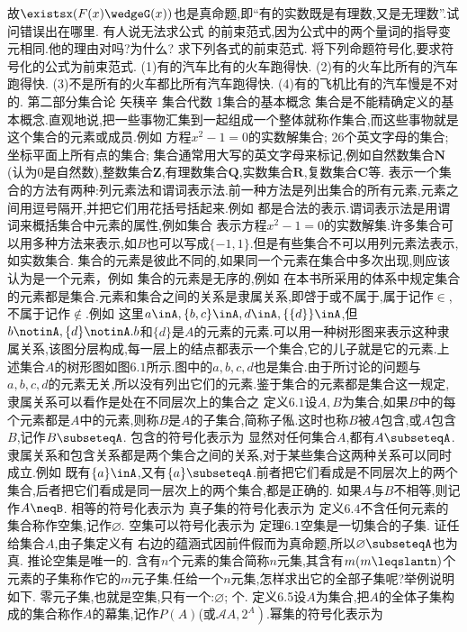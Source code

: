 {故$\existsx(F(x)\wedgeG(x))$也是真命题,即“有的实数既是有理数,又是无理数”.试问错误出在哪里.
有人说无法求公式
的前束范式,因为公式中的两个量词的指导变元相同.他的理由对吗?为什么?
求下列各式的前束范式.
将下列命题符号化,要求符号化的公式为前束范式.
(1)有的汽车比有的火车跑得快.
(2)有的火车比所有的汽车跑得快.
(3)不是所有的火车都比所有汽车跑得快.
(4)有的飞机比有的汽车慢是不对的.
{第二部分集合论}
{矢䄺辛
集合代数}
{1集合的基本概念}
集合是不能精确定义的基本概念.直观地说,把一些事物汇集到一起组成一个整体就称作集合,而这些事物就是这个集合的元素或成员.例如
方程$x^{2}-1=0$的实数解集合;
26个英文字母的集合;
坐标平面上所有点的集合;
集合通常用大写的英文字母来标记,例如自然数集合$\mathbf{N}$(认为0是自然数),整数集合$\mathbf{Z}$,有理数集合$\mathbf{Q}$,实数集合$\mathbf{R}$,复数集合$\mathbf{C}$等.
表示一个集合的方法有两种:列元素法和谓词表示法.前一种方法是列出集合的所有元素,元素之间用逗号隔开,并把它们用花括号括起来.例如
都是合法的表示.谓词表示法是用谓词来概括集合中元素的属性,例如集合
表示方程$x^{2}-1=0$的实数解集.许多集合可以用多种方法来表示,如$B$也可以写成$\{-1,1\}$.但是有些集合不可以用列元素法表示,如实数集合.
集合的元素是彼此不同的,如果同一个元素在集合中多次出现,则应该认为是一个元素，例如
集合的元素是无序的,例如
在本书所采用的体系中规定集合的元素都是集合.元素和集合之间的关系是隶属关系,即啔于或不属于,属于记作$\in$,不属于记作$\notin$.例如
这里$a\inA,\{b,c\}\inA,d\inA,\{\{d\}\}\inA$,但$b\notinA,\{d\}\notinA.b$和$\{d\}$是$A$的元素的元素.可以用一种树形图来表示这种隶属关系,该图分层构成,每一层上的结点都表示一个集合,它的儿子就是它的元素.上述集合$A$的树形图如图$6.1$所示.图中的$a,b,c,d$也是集合.由于所讨论的问题与$a,b,c,d$的元素无关,所以没有列出它们的元素.鉴于集合的元素都是集合这一规定,隶属关系可以看作是处在不同层次上的集合之
定义$6.1$设$A,B$为集合,如果$B$中的每个元素都是$A$中的元素,则称$B$是$A$的子集合,简称子俬.这时也称$B$被$A$包含,或$A$包含$B$,记作$B\subseteqA$.
包含的符号化表示为
显然对任何集合$A$,都有$A\subseteqA$.
隶属关系和包含关系都是两个集合之间的关系,对于某些集合这两种关系可以同时成立.例如
既有$\{a\}\inA$,又有$\{a\}\subseteqA$.前者把它们看成是不同层次上的两个集合,后者把它们看成是同一层次上的两个集合,都是正确的.
如果$A$与$B$不相等,则记作$A\neqB$.
相等的符号化表示为
真子集的符号化表示为
定义$6.4$不含任何元素的集合称作空集,记作$\varnothing$.
空集可以符号化表示为
定理$6.1$空集是一切集合的子集.
证任给集合$A$,由子集定义有
右边的蕴涵式因前件假而为真命题,所以$\varnothing\subseteqA$也为真.
推论空集是唯一的.
含有$n$个元素的集合简称$n$元集,其含有$m(m\leqslantn)$个元素的子集称作它的$m$元子集.任给一个$n$元集,怎样求出它的全部子集呢?举例说明如下.
零元子集,也就是空集,只有一个:$\varnothing$;
个.
定义6.5设$A$为集合,把$A$的全体子集构成的集合称作$A$的幕集,记作$P(A)$(或$\left.\mathscr{A}A,2^{A}\right)$.幂集的符号化表示为
}

